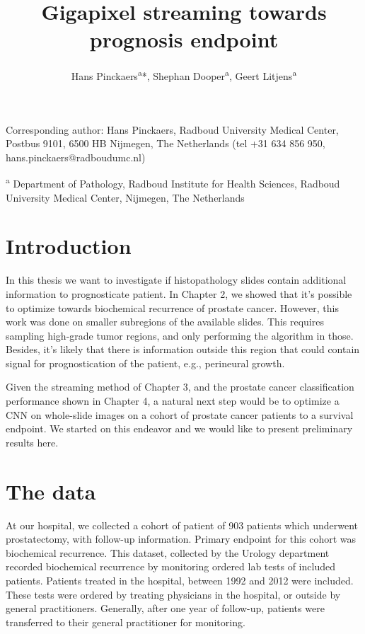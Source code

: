 \documentclass[
  12pt,
  a5,margin=2cmpaper,
]{article}
\title{Gigapixel streaming towards prognosis endpoint}
\author{Hans Pinckaers\textsuperscript{a}*, Shephan
Dooper\textsuperscript{a}, Geert Litjens\textsuperscript{a}}
\date{}
\begin{document}
\maketitle

Corresponding author: Hans Pinckaers, Radboud University Medical Center,
Postbus 9101, 6500 HB Nijmegen, The Netherlands (tel +31 634 856 950,
hans.pinckaers@radboudumc.nl)

\textsuperscript{a} Department of Pathology, Radboud Institute for
Health Sciences, Radboud University Medical Center, Nijmegen, The
Netherlands

\hypertarget{introduction}{%
\section{Introduction}\label{introduction}}

In this thesis we want to investigate if histopathology slides contain
additional information to prognosticate patient. In Chapter 2, we showed
that it's possible to optimize towards biochemical recurrence of
prostate cancer. However, this work was done on smaller subregions of
the available slides. This requires sampling high-grade tumor regions,
and only performing the algorithm in those. Besides, it's likely that
there is information outside this region that could contain signal for
prognostication of the patient, e.g., perineural growth.

Given the streaming method of Chapter 3, and the prostate cancer
classification performance shown in Chapter 4, a natural next step would
be to optimize a CNN on whole-slide images on a cohort of prostate
cancer patients to a survival endpoint. We started on this endeavor and
we would like to present preliminary results here.

\hypertarget{the-data}{%
\section{The data}\label{the-data}}

At our hospital, we collected a cohort of patient of 903 patients which
underwent prostatectomy, with follow-up information. Primary endpoint
for this cohort was biochemical recurrence. This dataset, collected by
the Urology department recorded biochemical recurrence by monitoring
ordered lab tests of included patients. Patients treated in the
hospital, between 1992 and 2012 were included. These tests were ordered
by treating physicians in the hospital, or outside by general
practitioners. Generally, after one year of follow-up, patients were
transferred to their general practitioner for monitoring.
\end{document}
